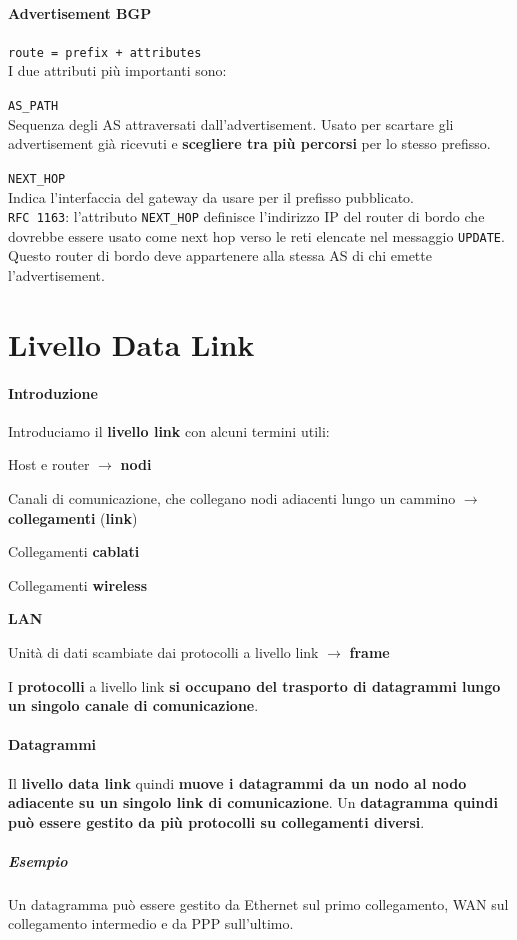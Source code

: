 \documentclass[10pt]{article}
\begin{document}
\paragraph{Advertisement BGP} \texttt{route = prefix + attributes}\\
I due attributi più importanti sono:
\begin{list}{}{}
	\item \texttt{AS\_PATH}\\
	Sequenza degli AS attraversati dall'advertisement. Usato per scartare gli advertisement già ricevuti e \textbf{scegliere tra più percorsi} per lo stesso prefisso.
	\item \texttt{NEXT\_HOP}\\
	Indica l'interfaccia del gateway da usare per il prefisso pubblicato.\\
	\texttt{RFC 1163}: l'attributo \texttt{NEXT\_HOP} definisce l'indirizzo IP del router di bordo che dovrebbe essere usato come next hop verso le reti elencate nel messaggio \texttt{UPDATE}. Questo router di bordo deve appartenere alla stessa AS di chi emette l'advertisement.
\end{list}
\pagebreak
\section{Livello Data Link}
\paragraph{Introduzione} Introduciamo il \textbf{livello link} con alcuni termini utili:
\begin{list}{}{}
	\item Host e router $\rightarrow$ \textbf{nodi}
	\item Canali di comunicazione, che collegano nodi adiacenti lungo un cammino $\rightarrow$ \textbf{collegamenti} (\textbf{link})
	\begin{list}{}{}
		\item Collegamenti \textbf{cablati}
		\item Collegamenti \textbf{wireless}
		\item \textbf{LAN}
	\end{list}
	\item Unità di dati scambiate dai protocolli a livello link $\rightarrow$ \textbf{frame}
\end{list}
I \textbf{protocolli} a livello link \textbf{si occupano del trasporto di datagrammi lungo un singolo canale di comunicazione}.
\paragraph{Datagrammi} Il \textbf{livello data link} quindi \textbf{muove i datagrammi da un nodo al nodo adiacente su un singolo link di comunicazione}. Un \textbf{datagramma quindi può essere gestito da più protocolli su collegamenti diversi}.
\subparagraph{Esempio} Un datagramma può essere gestito da Ethernet sul primo collegamento, WAN sul collegamento intermedio e da PPP sull'ultimo.
\end{document}
